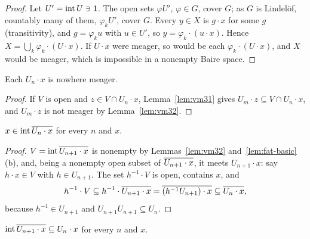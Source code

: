 \begin{proof}
Let $U'=\operatorname{int} U\ni1$. The open sets $\varphi U'$, $\varphi\in G$, cover $G$; as $G$ is Lindel\"of,
countably many of them, $\varphi_kU'$, cover $G$. Every $y\in X$ is $g\cdot x$ for some $g$ (transitivity),
and $g=\varphi_ku$ with $u\in U'$, so $y=\varphi_k\cdot(u\cdot x)$. Hence $X=\bigcup_k\varphi_k\cdot(U\cdot x)$.
If $U\cdot x$ were meager, so would be each $\varphi_k\cdot(U\cdot x)$, and $X$ would be meager, which is
impossible in a nonempty Baire space.
\end{proof}


\begin{lemma}\label{lem:vm33}
Each $U_n\cdot x$ is nowhere meager.
\end{lemma}

\begin{proof}
If $V$ is open and $z\in V\cap U_n\cdot x$, Lemma~\ref{lem:vm31} gives $U_m\cdot z\subseteq V\cap U_n\cdot x$,
and $U_m\cdot z$ is not meager by Lemma~\ref{lem:vm32}.
\end{proof}


\begin{lemma}\label{lem:vm34}
$x\in\operatorname{int}\overline{U_n\cdot x}$ for every $n$ and $x$.
\end{lemma}

\begin{proof}
$V=\operatorname{int}\overline{U_{n+1}\cdot x}$ is nonempty by Lemmas~\ref{lem:vm32} and~\ref{lem:fat-basic}(b), and,
being a nonempty open subset of $\overline{U_{n+1}\cdot x}$, it meets $U_{n+1}\cdot x$: say $h\cdot x\in V$ with
$h\in U_{n+1}$. The set $h^{-1}\cdot V$ is open, contains $x$, and
\[
h^{-1}\cdot V\subseteq h^{-1}\cdot\overline{U_{n+1}\cdot x}=\overline{(h^{-1}U_{n+1})\cdot x}\subseteq\overline{U_n\cdot x},
\]
because $h^{-1}\in U_{n+1}$ and $U_{n+1}U_{n+1}\subseteq U_n$.
\end{proof}


\begin{proposition}\label{prop:vm35}
$\operatorname{int}\overline{U_{n+1}\cdot x}\subseteq U_n\cdot x$ for every $n$ and $x$.
\end{proposition}

